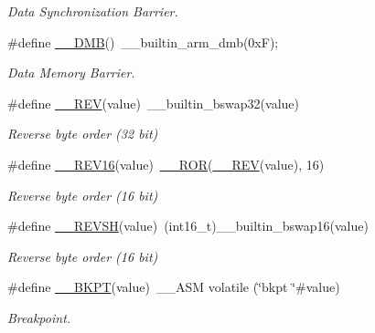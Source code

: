 \begin{DoxyCompactItemize}
\begin{DoxyCompactList}\small\item\em Data Synchronization Barrier. \end{DoxyCompactList}\item 
\#define \mbox{\hyperlink{group___c_m_s_i_s___core___instruction_interface_ga671101179b5943990785f36f8c1e2269}{\+\_\+\+\_\+\+D\+MB}}()~\+\_\+\+\_\+builtin\+\_\+arm\+\_\+dmb(0x\+F);
\begin{DoxyCompactList}\small\item\em Data Memory Barrier. \end{DoxyCompactList}\item 
\#define \mbox{\hyperlink{group___c_m_s_i_s___core___instruction_interface_gaca25a02e09983da5558f5242f2f635bc}{\+\_\+\+\_\+\+R\+EV}}(value)~\+\_\+\+\_\+builtin\+\_\+bswap32(value)
\begin{DoxyCompactList}\small\item\em Reverse byte order (32 bit) \end{DoxyCompactList}\item 
\#define \mbox{\hyperlink{group___c_m_s_i_s___core___instruction_interface_gad35497777af37e7809271b5e6f9510ba}{\+\_\+\+\_\+\+R\+E\+V16}}(value)~\mbox{\hyperlink{group___c_m_s_i_s___core___instruction_interface_gab16acb6456176f1e87a4f2724c2b6028}{\+\_\+\+\_\+\+R\+OR}}(\mbox{\hyperlink{group___c_m_s_i_s___core___instruction_interface_gadb92679719950635fba8b1b954072695}{\+\_\+\+\_\+\+R\+EV}}(value), 16)
\begin{DoxyCompactList}\small\item\em Reverse byte order (16 bit) \end{DoxyCompactList}\item 
\#define \mbox{\hyperlink{group___c_m_s_i_s___core___instruction_interface_gae580812686119c9c5cf3c11a7519a404}{\+\_\+\+\_\+\+R\+E\+V\+SH}}(value)~(int16\+\_\+t)\+\_\+\+\_\+builtin\+\_\+bswap16(value)
\begin{DoxyCompactList}\small\item\em Reverse byte order (16 bit) \end{DoxyCompactList}\item 
\#define \mbox{\hyperlink{group___c_m_s_i_s___core___instruction_interface_ga15ea6bd3c507d3e81c3b3a1258e46397}{\+\_\+\+\_\+\+B\+K\+PT}}(value)~\+\_\+\+\_\+\+A\+SM volatile (\char`\"{}bkpt \char`\"{}\#value)
\begin{DoxyCompactList}\small\item\em Breakpoint. \end{DoxyCompactList}\item 

\end{DoxyCompactItemize}

